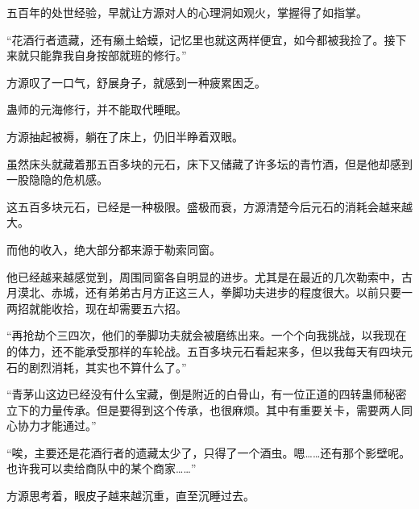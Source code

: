 \begin{this_body}
五百年的处世经验，早就让方源对人的心理洞如观火，掌握得了如指掌。

“花酒行者遗藏，还有癞土蛤蟆，记忆里也就这两样便宜，如今都被我捡了。接下来就只能靠我自身按部就班的修行。”

方源叹了一口气，舒展身子，就感到一种疲累困乏。

蛊师的元海修行，并不能取代睡眠。

方源抽起被褥，躺在了床上，仍旧半睁着双眼。

虽然床头就藏着那五百多块的元石，床下又储藏了许多坛的青竹酒，但是他却感到一股隐隐的危机感。

这五百多块元石，已经是一种极限。盛极而衰，方源清楚今后元石的消耗会越来越大。

而他的收入，绝大部分都来源于勒索同窗。

他已经越来越感觉到，周围同窗各自明显的进步。尤其是在最近的几次勒索中，古月漠北、赤城，还有弟弟古月方正这三人，拳脚功夫进步的程度很大。以前只要一两招就能收拾，现在却需要五六招。

“再抢劫个三四次，他们的拳脚功夫就会被磨练出来。一个个向我挑战，以我现在的体力，还不能承受那样的车轮战。五百多块元石看起来多，但以我每天有四块元石的剧烈消耗，其实也不算什么了。”

“青茅山这边已经没有什么宝藏，倒是附近的白骨山，有一位正道的四转蛊师秘密立下的力量传承。但是要得到这个传承，也很麻烦。其中有重要关卡，需要两人同心协力才能通过。”

“唉，主要还是花酒行者的遗藏太少了，只得了一个酒虫。嗯……还有那个影壁呢。也许我可以卖给商队中的某个商家……”

方源思考着，眼皮子越来越沉重，直至沉睡过去。

\end{this_body}

